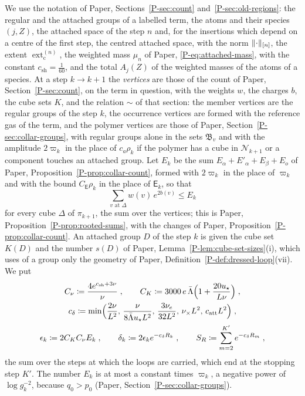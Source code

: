 \documentclass[11pt]{preprint}
\DeclarePairedDelimiter{\norm}{\lVert}{\rVert}
\numberwithin{equation}{section}
\theoremstyle{definition}
\theoremstyle{remark}
\theoremstyle{plain}
\begin{document}
We use the notation of Paper, Sections~\ref{P-sec:count} and~\ref{P-sec:old-regions}: the regular and the attached groups of a labelled term, the atoms and their species $(j, Z)$, the attached space of the step $n$ and, for the insertions which depend on a centre of the first step, the centred attached space, with the norm $\norm{\cdot}_{[n]}$, the extent $\operatorname{ext}^{(n)}_{\mathrm c}$, the weighted mass $\mu_n$ of Paper, \eqref{P-eq:attached-mass}, with the constant $c_{\mathrm{sh}} = \frac{1}{60}$, and the total $A_j(Z)$ of the weighted masses of the atoms of a species. At a step $k \to k + 1$ the \emph{vertices} are those of the count of Paper, Section~\ref{P-sec:count}, on the term in question, with the weights $w$, the charges $b$, the cube sets $K$, and the relation $\sim$ of that section: the member vertices are the regular groups of the step $k$, the occurrence vertices are formed with the reference gas of the term, and the polymer vertices are those of Paper, Section~\ref{P-sec:collar-groups}, with regular groups alone in the sets $\mathfrak B_v$ and with the amplitude $2\varpi_k$ in the place of $c_a\rho_k$ if the polymer has a cube in $\mathcal N_{k+1}$ or a component touches an attached group. Let $E_k$ be the sum $E_\alpha + E'_\alpha + E_\beta + E_o$ of Paper, Proposition~\ref{P-prop:collar-count}, formed with $2\varpi_k$ in the place of $\varpi_k$ and with the bound $C_{\mathsf E}\rho_k$ in the place of $\mathsf E_k$, so that
\begin{equation}\label{eq:vertex-total}
    \sum_{v \text{ at } \Delta}w(v)\,e^{2b(v)} \leq E_k
\end{equation}
for every cube $\Delta$ of $\pi_{k+1}$, the sum over the vertices; this is Paper, Proposition~\ref{P-prop:rooted-sums}, with the changes of Paper, Proposition~\ref{P-prop:collar-count}. An attached group $D$ of the step $k$ is given the cube set $K(D)$ and the number $s(D)$ of Paper, Lemma~\ref{P-lem:cube-set-sizes}(i), which uses of a group only the geometry of Paper, Definition~\ref{P-def:dressed-loop}(vii). We put
\begin{equation}\label{eq:carry-rates}
\begin{gathered}
    C_\nu \coloneqq \frac{4e^{c_{\mathrm{sh}} + 3\nu}}{\nu}\;,
    \qquad
    C_K \coloneqq 3000\,e\,\bar\Lambda\Bigl(1 + \frac{20u_\star}{L\nu}\Bigr)\;,\\
    c_\delta \coloneqq \min\Bigl(\frac{2\nu}{L^2},\, \frac{\nu}{8\bar\Lambda u_\star L^2},\, \frac{3\nu_e}{32L^2},\, \nu_\times L^2,\, c_{\mathrm{att}}L^2\Bigr)\;,\\
    \epsilon_k \coloneqq 2C_KC_\nu E_k\;,
    \qquad
    \delta_k \coloneqq 2\epsilon_ke^{-c_\delta R_k}\;,
    \qquad
    S_R \coloneqq \sum_{m=2}^{K'}e^{-c_\delta R_m}\;,
\end{gathered}
\end{equation}
the sum over the steps at which the loops are carried, which end at the stopping step $K'$. The number $E_k$ is at most a constant times $\varpi_k$, a negative power of $\log g_k^{-2}$, because $q_0 > p_0$ (Paper, Section~\ref{P-sec:collar-groups}).
\end{document}
